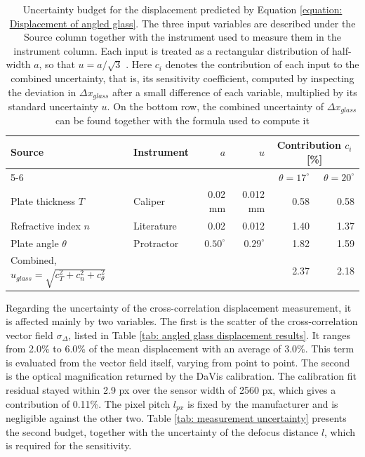 \begin{table}[h]
    \centering
    \caption[Uncertainty budget of the predicted glass displacement]{Uncertainty budget for the displacement predicted by Equation \ref{equation: Displacement of angled glass}. The three input variables are described under the Source column together with the instrument used to measure them in the instrument column. Each input is treated as a rectangular distribution of half-width $a$, so that $u = a/\sqrt{3}$ \cite{JCGM2008}. Here $c_i$ denotes the contribution of each input to the combined uncertainty, that is, its sensitivity coefficient, computed by inspecting the deviation in $\Delta x_{glass}$ after a small difference of each variable, multiplied by its standard uncertainty $u$. On the bottom row, the combined uncertainty of $\Delta x_{glass}$ can be found together with the formula used to compute it}
    \label{tab: angled glass uncertainty}
    \begin{tabular}{llrrrr}
        \toprule
        Source & Instrument & $a$ & $u$ & \multicolumn{2}{c}{Contribution $c_i$ [\%]} \\
        \cmidrule(lr){5-6}
               &            &     &          & $\theta = 17^{\circ}$ & $\theta = 20^{\circ}$ \\
        \midrule
        Plate thickness $T$  & Caliper    & 0.02 mm         & 0.012 mm         & 0.58 & 0.58 \\
        Refractive index $n$ & Literature & 0.02            & 0.012            & 1.40 & 1.37 \\
        Plate angle $\theta$ & Protractor & $0.50^{\circ}$  & $0.29^{\circ}$   & 1.82 & 1.59 \\
        \midrule
        Combined, $u_{glass} = \sqrt{c_T^2 + c_n^2 + c_\theta^2}$             &            &                 &                  & 2.37 & 2.18 \\
        \bottomrule
    \end{tabular}
\end{table}

\par Regarding the uncertainty of the cross-correlation displacement measurement, it is affected mainly by two variables. The first is the scatter of the cross-correlation vector field $\sigma_\Delta$, listed in Table \ref{tab: angled glass displacement results}. It ranges from 2.0\% to 6.0\% of the mean displacement with an average of 3.0\%. This term is evaluated from the vector field itself, varying from point to point. The second is the optical magnification returned by the DaVis calibration. The calibration fit residual stayed within 2.9 px over the sensor width of 2560 px, which gives a contribution of 0.11\%. The pixel pitch $l_{px}$ is fixed by the manufacturer and is negligible against the other two. Table \ref{tab: measurement uncertainty} presents the second budget, together with the uncertainty of the defocus distance $l$, which is required for the sensitivity.


